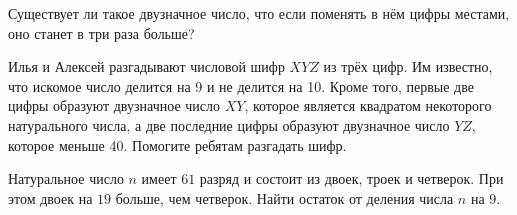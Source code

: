 ﻿
\begin{itemize}

\itA Существует ли такое двузначное число, что если поменять в нём цифры местами, оно станет в три раза больше?

\itB Илья и Алексей разгадывают числовой шифр $XYZ$ из трёх цифр. Им известно, что искомое число делится на 9 и не делится на 10. Кроме того, первые две цифры образуют двузначное число $XY$, которое является квадратом некоторого натурального числа, а две последние цифры образуют двузначное число $YZ$, которое меньше 40. Помогите ребятам разгадать шифр.

\itC Натуральное число $n$ имеет $61$ разряд и состоит из двоек, троек и четверок. При этом двоек на $19$ больше, чем четверок. Найти остаток от деления числа $n$ на 9.
\end{itemize}